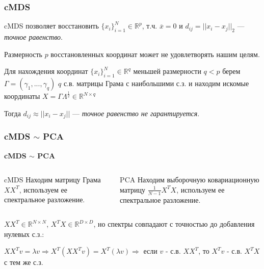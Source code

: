 \documentclass[10pt]{beamer}
\newcommand{\real}{\mathbb{R}}
\begin{document}
\begin{frame}
\frametitle{cMDS}

cMDS позволяет восстановить $\{x_i\}_{i=1}^{N} \in \real^p$, т.ч. $\overline{x} = 0$ и $d_{ij} = ||x_i - x_j||_2$ --- \textit{точное равенство}.

\vspace{\baselineskip}
Размерность $p$ восстановленных координат может не удовлетворять нашим целям.

\vspace{\baselineskip}
Для нахождения координат $\{x_i\}_{i=1}^{N} \in \real^q$ меньшей размерности $q < p$ берем $\Gamma = (\gamma_1, ..., \gamma_q)$ $q$ с.в. матрицы Грама с наибольшими с.з. и находим искомые координаты $X = \Gamma \Lambda^{\frac{1}{2}} \in \real^{N \times q}$ 

\vspace{\baselineskip}
Тогда $d_{ij} \approx ||x_i - x_j||$ --- \textit{точное равенство не гарантируется}.


\end{frame}
\begin{frame}
\frametitle{cMDS $\sim$ PCA}

\begin{center}
\textbf{cMDS $\sim$ PCA}
\end{center}

\begin{columns}[t] %

\begin{block}{cMDS}
Находим матрицу Грама $XX^T$, используем ее спектральное разложение.
\end{block}

\begin{block}{PCA}
Находим выборочную ковариационную матрицу $\frac{1}{N - 1} X^TX$, используем ее спектральное разложение.
\end{block}
\end{columns}

\vspace{\baselineskip}
$XX^T \in \real^{N \times N}$, $X^TX \in \real^{D \times D}$, но спектры совпадают с точностью до добавления нулевых с.з.:

\vspace{\baselineskip}
$XX^Tv = \lambda v \Rightarrow X^T(XX^Tv) = X^T(\lambda v) \Rightarrow$ если $v$ - с.в. $XX^T$, то $X^Tv$ - с.в. $X^T X$ с тем же с.з.
\end{frame}
\end{document}
